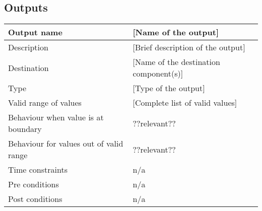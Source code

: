 \subsection{Outputs}

\begin{longtable}{p{}p{}}
\toprule
Output name			& [Name of the output] \\
\midrule
Description			& [Brief description of the output] \\
\midrule
Destination			& [Name of the destination component(s)] \\ 
\midrule
Type				& [Type of the output] \\
\midrule
Valid range of values	& [Complete list of valid values] \\
\midrule
Behaviour when value is at boundary	& ??relevant?? \\
\midrule
Behaviour for values out of valid range	& ??relevant?? \\
\midrule
Time constraints	& n/a \\
\midrule
Pre conditions 		& n/a \\
\midrule
Post conditions 	& n/a \\
\bottomrule
\end{longtable}

